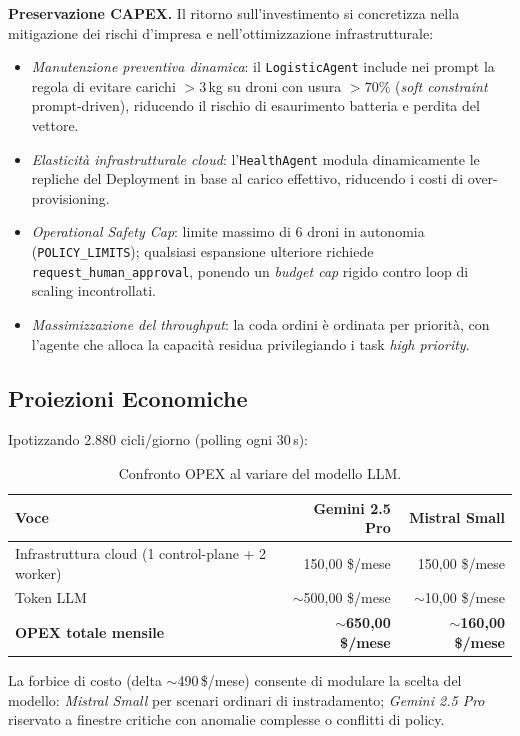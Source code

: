 \textbf{Preservazione CAPEX.} Il ritorno sull'investimento si concretizza nella mitigazione dei rischi d'impresa e nell'ottimizzazione infrastrutturale:
\begin{itemize}
    \item \textit{Manutenzione preventiva dinamica}: il \texttt{LogisticAgent} include nei prompt la regola di evitare carichi $>3$\,kg su droni con usura $>70\%$ (\textit{soft constraint} prompt-driven), riducendo il rischio di esaurimento batteria e perdita del vettore.
    \item \textit{Elasticità infrastrutturale cloud}: l'\texttt{HealthAgent} modula dinamicamente le repliche del Deployment in base al carico effettivo, riducendo i costi di over-provisioning.
    \item \textit{Operational Safety Cap}: limite massimo di 6 droni in autonomia (\texttt{POLICY\_LIMITS}); qualsiasi espansione ulteriore richiede \texttt{request\_human\_approval}, ponendo un \textit{budget cap} rigido contro loop di scaling incontrollati.
    \item \textit{Massimizzazione del throughput}: la coda ordini è ordinata per priorità, con l'agente che alloca la capacità residua privilegiando i task \textit{high priority}.
\end{itemize}

\subsection*{Proiezioni Economiche}
Ipotizzando 2.880 cicli/giorno (polling ogni 30\,s):

\begin{table}[ht]
\centering
\begin{tabular}{lrr}
\toprule
\textbf{Voce} & \textbf{Gemini 2.5 Pro} & \textbf{Mistral Small} \\
\midrule
Infrastruttura cloud (1 control-plane + 2 worker) & 150{,}00 \$/mese & 150{,}00 \$/mese \\
Token LLM & $\sim$500{,}00 \$/mese & $\sim$10{,}00 \$/mese \\
\midrule
\textbf{OPEX totale mensile} & \textbf{$\sim$650{,}00 \$/mese} & \textbf{$\sim$160{,}00 \$/mese} \\
\bottomrule
\end{tabular}
\caption{Confronto OPEX al variare del modello LLM.}
\label{tab:costi_opex}
\end{table}

La forbice di costo (delta $\sim$490\,\$/mese) consente di modulare la scelta del modello: \textit{Mistral Small} per scenari ordinari di instradamento; \textit{Gemini 2.5 Pro} riservato a finestre critiche con anomalie complesse o conflitti di policy.


